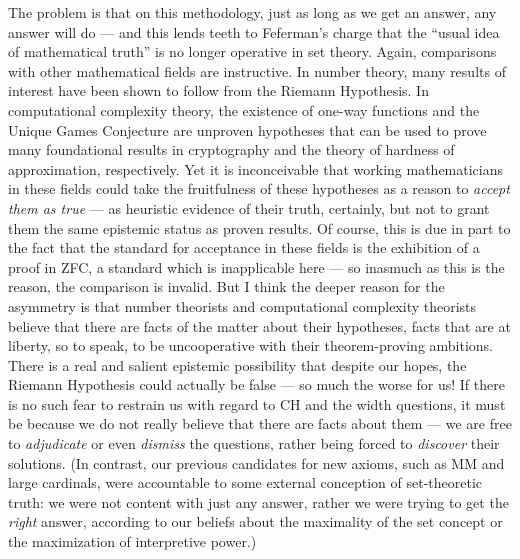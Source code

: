 \documentclass[letterpaper,12pt]{article}
\begin{document}
The problem is that on this methodology, just as long as we get an answer, any answer will do --- and this lends teeth to Feferman's charge that the ``usual idea of mathematical truth'' is no longer operative in set theory. Again, comparisons with other mathematical fields are instructive. In number theory, many results of interest have been shown to follow from the Riemann Hypothesis. In computational complexity theory, the existence of one-way functions \citep{Goldreich:2006:FCV:1202577} and the Unique Games Conjecture \citep{trevisan2012khot} are unproven hypotheses that can be used to prove many foundational results in cryptography and the theory of hardness of approximation, respectively. Yet it is inconceivable that working mathematicians in these fields could take the fruitfulness of these hypotheses as a reason to \emph{accept them as true} --- as heuristic evidence of their truth, certainly, but not to grant them the same epistemic status as proven results. Of course, this is due in part to the fact that the standard for acceptance in these fields is the exhibition of a proof in ZFC, a standard which is inapplicable here --- so inasmuch as this is the reason, the comparison is invalid. But I think the deeper reason for the asymmetry is that number theorists and computational complexity theorists believe that there are facts of the matter about their hypotheses, facts that are at liberty, so to speak, to be uncooperative with their theorem-proving ambitions. There is a real and salient epistemic possibility that despite our hopes, the Riemann Hypothesis could actually be false --- so much the worse for us! If there is no such fear to restrain us with regard to CH and the width questions, it must be because we do not really believe that there are facts about them --- we are free to \emph{adjudicate} or even \emph{dismiss} the questions, rather being forced to \emph{discover} their solutions. (In contrast, our previous candidates for new axioms, such as MM and large cardinals, were accountable to some external conception of set-theoretic truth: we were not content with just any answer, rather we were trying to get the \emph{right} answer, according to our beliefs about the maximality of the set concept or the maximization of interpretive power.)
\end{document}
